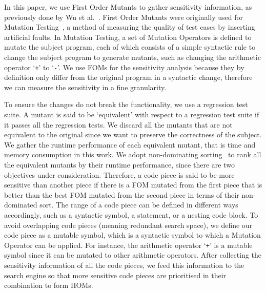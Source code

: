 \documentclass[oribibl]{llncs}
\begin{document}
In this paper, we use First Order Mutants to gather sensitivity information, as previously done by Wu et al.~\cite{Wu:2015:DPO:2739480.2754648}.
First Order Mutants were originally used for Mutation Testing~\cite{demillo1978hints}, a method of measuring the quality of test cases by inserting artificial faults.
In Mutation Testing, a set of Mutation Operators is defined to mutate the subject program, each of which consists of a simple syntactic rule to change the subject program to generate mutants, such as changing the arithmetic operator `\texttt{+}' to `\texttt{-}'.
We use FOMs for the sensitivity analysis because they by definition only differ from the original program in a syntactic change, therefore we can measure the sensitivity in a fine granularity.

To ensure the changes do not break the functionality, we use a regression test suite.
A mutant is said to be `equivalent' with respect to a regression test suite if it passes all the regression tests.
We discard all the mutants that are not equivalent to the original since we want to preserve the correctness of the subject.
We gather the runtime performance of each equivalent mutant, that is time and memory consumption in this work.
We adopt non-dominating sorting~\cite{996017} to rank all the equivalent mutants by their runtime performance, since there are two objectives under consideration.
Therefore, a code piece is said to be more sensitive than another piece if there is a FOM mutated from the first piece that is better than the best FOM mutated from the second piece in terms of their non-dominated sort.
The range of a code piece can be defined in different ways accordingly, such as a syntactic symbol, a statement, or a nesting code block.
To avoid overlapping code pieces (meaning redundant search space), we define our code piece as a mutable symbol, which is a syntactic symbol to which a Mutation Operator can be applied.
For instance, the arithmetic operator `\texttt{+}' is a mutable symbol since it can be mutated to other arithmetic operators.
After collecting the sensitivity information of all the code pieces, we feed this information to the search engine so that more sensitive code pieces are prioritised in their combination to form HOMs.
\end{document}
